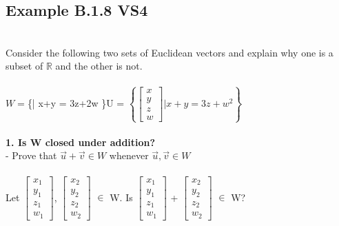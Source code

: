 \documentclass{article}
\begin{document}
{\subsection*{Example B.1.8 VS4}\\
Consider the following two sets of Euclidean vectors and explain why one is a subset of $\mathbb{R}$ and the other is not.\\
\\
$W = $\left\{\left[\begin{matrix}x\\y\\z\\w\end{matrix}\right] \Bigg| x+y = 3z+2w \right\}$ 
$U = $\left\{\left[\begin{matrix}x\\y\\z\\w\end{matrix}\right] \Bigg| x+y = 3z+w^{2} \right\}$\\
\\
\textbf{1. Is W closed under addition?}\\
- Prove that $\vec{u} + \vec{v} \in W$ whenever  $\vec{u}, \vec{v} \in W$\\
\\
Let $\left[\begin{matrix}x_{1}\\y_{1}\\z{_1}\\w_{1}\end{matrix}\right]$, $\left[\begin{matrix}x_{2}\\y_{2}\\z{_2}\\w_{2}\end{matrix}\right]$ $\in$ W.  Is $\left[\begin{matrix}x_{1}\\y_{1}\\z{_1}\\w_{1}\end{matrix}\right]$ + $\left[\begin{matrix}x_{2}\\y_{2}\\z{_2}\\w_{2}\end{matrix}\right]$ $\in$ W? \\
\\
\\
}
\end{document}

